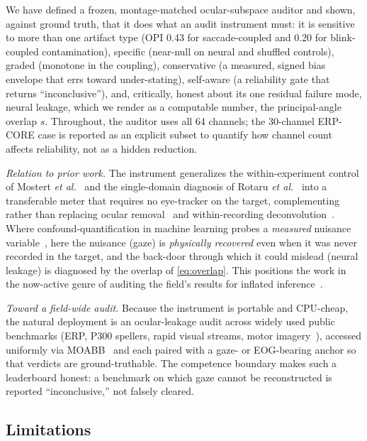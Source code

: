 \documentclass[conference]{IEEEtran}
\begin{document}
We have defined a frozen, montage-matched ocular-subspace auditor and shown, against ground
truth, that it does what an audit instrument must: it is sensitive to more than one artifact
type (OPI 0.43 for saccade-coupled and 0.20 for blink-coupled contamination), specific
(near-null on neural and shuffled controls), graded (monotone in the coupling), conservative
(a measured, signed bias envelope that errs toward under-stating), self-aware (a reliability
gate that returns ``inconclusive''), and, critically, honest about its one residual failure
mode, neural leakage, which we render as a computable number, the principal-angle overlap $s$.
Throughout, the auditor uses all 64 channels; the 30-channel ERP-CORE case is reported as an
explicit subset to quantify how channel count affects reliability, not as a hidden reduction.

\emph{Relation to prior work.} The instrument generalizes the within-experiment control of
Mostert \emph{et al.}~\cite{mostert2018eye} and the single-domain diagnosis of Rotaru
\emph{et al.}~\cite{rotaru2024decoding} into a transferable meter that requires no eye-tracker
on the target, complementing rather than replacing ocular
removal~\cite{jung2000removing,dimigen2020optimizing} and within-recording
deconvolution~\cite{ehinger2019unfold}. Where confound-quantification in machine learning
probes a \emph{measured} nuisance variable~\cite{chaibubneto2018permutations}, here the nuisance
(gaze) is \emph{physically recovered} even when it was never recorded in the target, and the
back-door through which it could mislead (neural leakage) is diagnosed by the overlap of \eqref{eq:overlap}.
This positions the work in the now-active genre of auditing the field's results for inflated
inference~\cite{eklund2016cluster,kapoor2023leakage,brookshire2024leakage}.

\emph{Toward a field-wide audit.} Because the instrument is portable and CPU-cheap, the natural
deployment is an ocular-leakage audit across widely used public benchmarks (ERP, P300 spellers,
rapid visual streams, motor imagery~\cite{kappenman2021erpcore,polich2007p300,arico2014p300jitter,gifford2022thingseeg2}),
accessed uniformly via MOABB~\cite{jayaram2018moabb} and each paired with a gaze- or EOG-bearing
anchor so that verdicts are ground-truthable. The competence boundary makes
such a leaderboard honest: a benchmark on which gaze cannot be reconstructed is reported
``inconclusive,'' not falsely cleared.

\subsection{Limitations}
\end{document}
